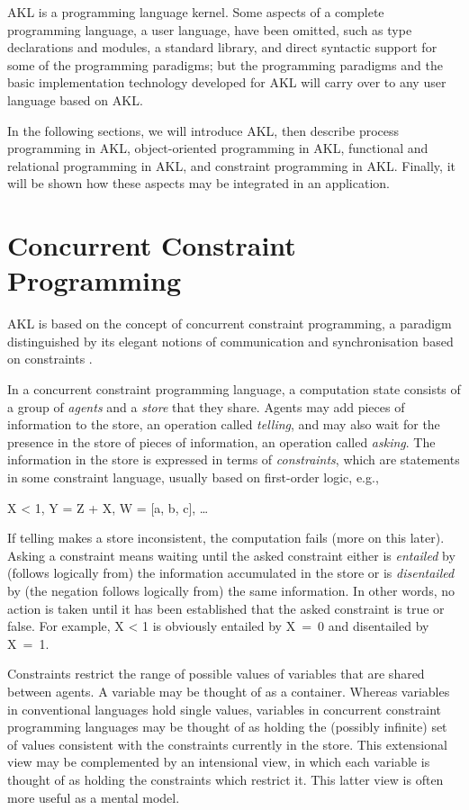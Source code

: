 AKL is a programming language kernel.  Some aspects of a complete
programming language, a user language, have been omitted, such as type
declarations and modules, a standard library, and direct syntactic
support for some of the programming paradigms; but the programming
paradigms and the basic implementation technology developed for AKL
will carry over to any user language based on AKL.
                     

In the following sections, we will introduce AKL, then describe
process programming in AKL, object-oriented programming in AKL,
functional and relational programming in AKL, and constraint
programming in AKL.  Finally, it will be shown how these aspects may
be integrated in an application.

\section{Concurrent Constraint Programming}

AKL is based on the concept of concurrent constraint programming, a 
paradigm distinguished by its elegant notions of communication and 
synchronisation based on constraints \cite{sar93}.

In a concurrent constraint programming language, a computation state
consists of a group of {\em agents} and a {\em store} that they share.
Agents may add pieces of information to the store, an operation called
{\em telling}, and may also wait for the presence in the store of
pieces of information, an operation called {\em asking}.  The
information in the store is expressed in terms of {\em constraints},
which are statements in some constraint language, usually based on
first-order logic, e.g.,
%
\begin{progex}
X < 1,  Y = Z + X,  W = [a, b, c], \dots
\end{progex}%
%
If telling makes a store inconsistent, the computation fails (more on
this later).  Asking a constraint means waiting until the asked
constraint either is {\em entailed} by (follows logically from) the
information accumulated in the store or is {\em disentailed} by (the
negation follows logically from) the same information.  In other
words, no action is taken until it has been established that the asked
constraint is true or false.  For example, {\prog X < 1} is obviously
entailed by {\prog X~=~0} and disentailed by {\prog X~=~1}.

Constraints restrict the range of possible values of variables that
are shared between agents.  A variable may be thought of as a
container.  Whereas variables in conventional languages hold single
values, variables in concurrent constraint programming languages may
be thought of as holding the (possibly infinite) set of values
consistent with the constraints currently in the store.  This
extensional view may be complemented by an intensional view, in which
each variable is thought of as holding the constraints which restrict
it.  This latter view is often more useful as a mental model.
                                  
